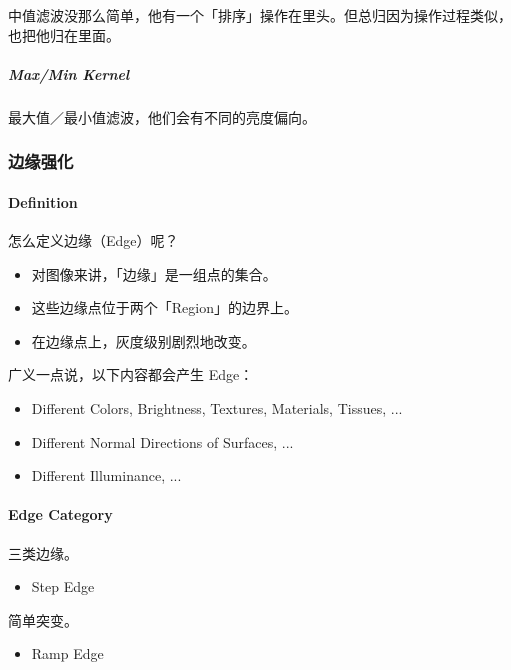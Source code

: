 \documentclass[
]{article}
\begin{document}
中值滤波没那么简单，他有一个「排序」操作在里头。但总归因为操作过程类似，也把他归在里面。

\hypertarget{header-n41}{%
\subparagraph{Max/Min Kernel}\label{header-n41}}

最大值／最小值滤波，他们会有不同的亮度偏向。

\hypertarget{header-n43}{%
\subsubsection{边缘强化}\label{header-n43}}

\hypertarget{header-n44}{%
\paragraph{Definition}\label{header-n44}}

怎么定义边缘（Edge）呢？

\begin{itemize}
\item
  对图像来讲，「边缘」是一组点的集合。
\item
  这些边缘点位于两个「Region」的边界上。
\item
  在边缘点上，灰度级别剧烈地改变。
\end{itemize}

广义一点说，以下内容都会产生 Edge：

\begin{itemize}
\item
  Different Colors, Brightness, Textures, Materials, Tissues, ...
\item
  Different Normal Directions of Surfaces, ...
\item
  Different Illuminance, ...
\end{itemize}

\hypertarget{header-n61}{%
\paragraph{Edge Category}\label{header-n61}}

三类边缘。

\begin{itemize}
\item
  Step Edge
\end{itemize}

简单突变。

\begin{itemize}
\item
  Ramp Edge
\end{itemize}
\end{document}
